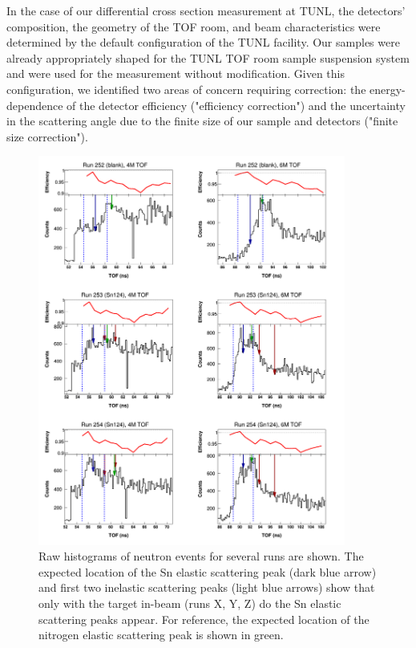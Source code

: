 In the case of our differential cross section measurement at TUNL, the detectors'
composition, the geometry of the TOF room, and beam characteristics were
determined by the default configuration of the TUNL facility. Our samples were already
appropriately shaped for the TUNL TOF room sample suspension system and were
used for the measurement without modification. Given this configuration, we
identified two areas of concern requiring correction: the energy-dependence of
the detector efficiency ("efficiency correction") and the uncertainty in the
scattering angle due to the finite size of our sample and detectors ("finite
size correction").

\begin{figure}
    \includegraphics[width = 0.9\textwidth]{figures/tiledRunData.png}
    \caption{Raw histograms of neutron events for several runs are shown. The
        expected location of the Sn elastic scattering peak (dark blue arrow)
        and first two inelastic scattering peaks (light blue arrows) show that
        only with the target in-beam (runs X, Y, Z) do the Sn elastic scattering
        peaks appear. For reference, the expected location of the nitrogen elastic scattering
    peak is shown in green.} \label{tiledRunData}
\end{figure}

